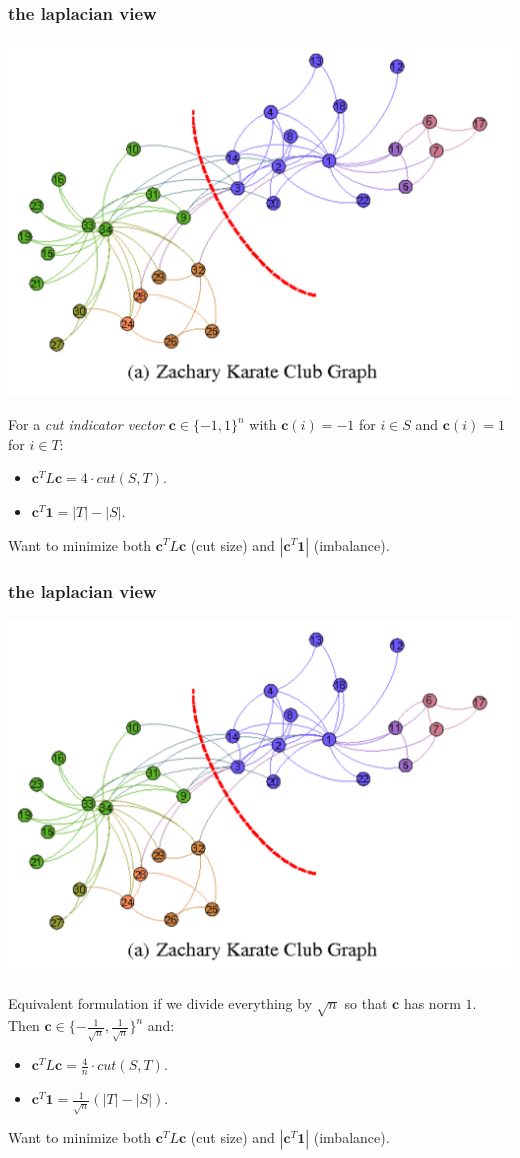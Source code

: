 \documentclass[compress]{beamer}
\newcommand{\bv}[1]{\mathbf{#1}}
\begin{document}
\begin{frame}
	\frametitle{the laplacian view}
	\begin{center}
	\includegraphics[width=.4\textwidth]{karate.png}
	\end{center}
	For a \emph{cut indicator vector} $\bv{c} \in \{-1,1\}^n$ with $\bv{c}(i) = -1$ for $i \in S$ and $\bv{c}(i) = 1$ for $i \in T$:
	\begin{itemize}
		\item $\bv{c}^T L \bv{c} = 4 \cdot cut(S,T)$.
		\item $\bv{c}^T \bv{1} = |T| - |S|$.
	\end{itemize}
	Want to minimize both $\bv{c}^T L \bv{c}$ (cut size) and $|\bv{c}^T \bv{1}|$ (imbalance).
\end{frame}

\begin{frame}
	\frametitle{the laplacian view}
	\begin{center}
		\includegraphics[width=.4\textwidth]{karate.png}
	\end{center}
	Equivalent formulation if we divide everything by $\sqrt{n}$ so that $\bv{c}$ has norm $1$. Then $\bv{c} \in \{-\frac{1}{\sqrt{n}},\frac{1}{\sqrt{n}}\}^n$ and:
	\begin{itemize}
		\item $\bv{c}^T L \bv{c} = \frac{4}{n} \cdot cut(S,T)$.
		\item $\bv{c}^T \bv{1} = \frac{1}{\sqrt{n}}(|T| - |S|)$.
	\end{itemize}
	Want to minimize both $\bv{c}^T L \bv{c}$ (cut size) and $|\bv{c}^T \bv{1}|$ (imbalance).
\end{frame}
\end{document}
